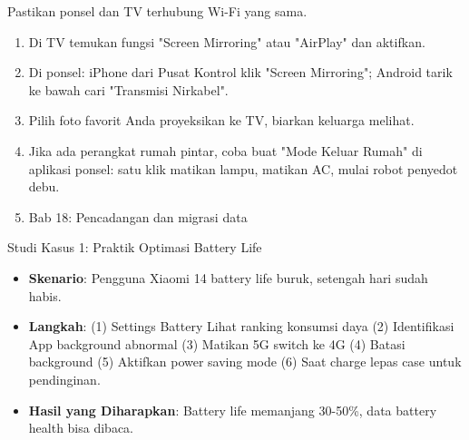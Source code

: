 \begin{tcbpractice}{Pastikan ponsel dan TV terhubung Wi-Fi yang sama.}
\begin{enumerate}
  \item Di TV temukan fungsi "Screen Mirroring" atau "AirPlay" dan aktifkan.
  \item Di ponsel: iPhone dari Pusat Kontrol klik "Screen Mirroring"; Android tarik ke bawah cari "Transmisi Nirkabel".
  \item Pilih foto favorit Anda proyeksikan ke TV, biarkan keluarga melihat.
  \item Jika ada perangkat rumah pintar, coba buat "Mode Keluar Rumah" di aplikasi ponsel: satu klik matikan lampu, matikan AC, mulai robot penyedot debu.
  \item Bab 18: Pencadangan dan migrasi data
\end{enumerate}

\end{tcbpractice}

\begin{tcbinfo}{Studi Kasus 1: Praktik Optimasi Battery Life}
\begin{itemize}
  \item \textbf{Skenario}: Pengguna Xiaomi 14 battery life buruk, setengah hari sudah habis.
  \item \textbf{Langkah}: (1) Settings Battery Lihat ranking konsumsi daya (2) Identifikasi App background abnormal (3) Matikan 5G switch ke 4G (4) Batasi background (5) Aktifkan power saving mode (6) Saat charge lepas case untuk pendinginan.
  \item \textbf{Hasil yang Diharapkan}: Battery life memanjang 30-50\%, data battery health bisa dibaca.
\end{itemize}

\end{tcbinfo}
